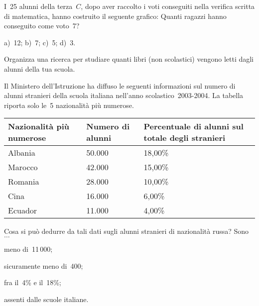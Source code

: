 \begin{multicols}{2}
\begin{esercizio}
\label{ese:A.56}
I~25 alunni della terza~$C$, dopo aver raccolto i voti conseguiti
nella verifica scritta di matematica, hanno costruito il seguente grafico:
Quanti ragazzi hanno conseguito come voto~7?

a)~12; \quad b)~7; \quad c)~5; \quad d)~3.
\begin{center}
 
\end{center}
\end{esercizio}
\end{multicols}

\begin{esercizio}
\label{ese:A.57}
Organizza una ricerca per studiare quanti libri (non scolastici) vengono 
letti
dagli alunni della tua scuola.
\end{esercizio}

%  

\begin{esercizio}
\label{ese:A.58}
Il Ministero dell'Istruzione ha diffuso le seguenti informazioni sul numero 
di alunni stranieri della scuola italiana
nell'anno scolastico~2003-2004. La tabella riporta solo le~5 nazionalità 
più numerose.
\begin{center}
 \begin{tabularx}{.9\textwidth}{*{3}{X}}
\toprule
Nazionalità più numerose & Numero di alunni & Percentuale di alunni sul 
totale degli stranieri \\
\midrule
Albania & 50.000 & 18,00\% \\
Marocco & 42.000 & 15,00\% \\
Romania & 28.000 & 10,00\% \\
Cina & 16.000 & 6,00\% \\
Ecuador & 11.000 & 4,00\% \\
\bottomrule
\end{tabularx}
\end{center}

Cosa si può dedurre da tali dati sugli alunni stranieri di nazionalità 
russa? Sono~$\ldots$
\begin{multicols}{2}
\begin{enumeratea}
 \item meno di~11\,000;
 \item sicuramente meno di~400;
 \item fra il~4\% e il~18\%;
 \item assenti dalle scuole italiane.
\end{enumeratea}
\end{multicols}
\end{esercizio}

